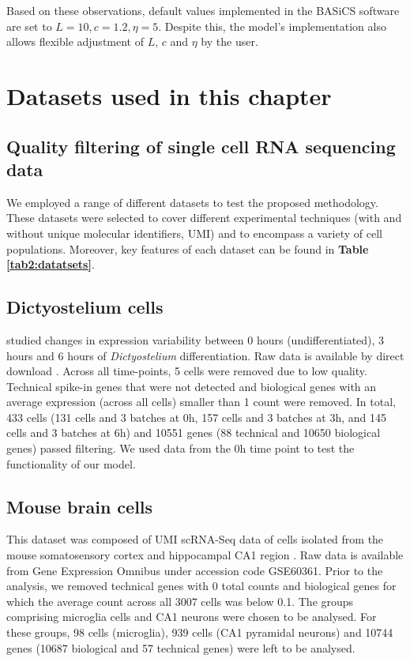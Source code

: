 Based on these observations, default values implemented in the BASiCS software are set to $L=10, c=1.2, \eta=5$. Despite this, the model's implementation also allows flexible adjustment of $L$, $c$ and $\eta$ by the user. 

\section{Datasets used in this chapter} \label{sec2:datasets}

\subsection*{Quality filtering of single cell RNA sequencing data}
We employed a range of different datasets to test the proposed methodology. These datasets were selected to cover different experimental techniques (with and without unique molecular identifiers, UMI) and to encompass a variety of cell populations. Moreover, key features of each dataset can be found in \textbf{Table \ref{tab2:datatsets}}. 

\subsection{Dictyostelium cells} \label{seq::data_dict}

\cite{Antolovic2017} studied changes in expression variability between 0 hours (undifferentiated), 3 hours and 6 hours of \emph{Dictyostelium} differentiation. Raw data is available by direct download \citep[see Data S1 in][]{Antolovic2017}. Across all time-points, 5 cells were removed due to low quality. Technical spike-in genes that were not detected and biological genes with an average expression (across all cells) smaller than 1 count were removed. In total, 433 cells (131 cells and 3 batches at 0h, 157 cells and 3 batches at 3h, and 145 cells and 3 batches at 6h) and 10551 genes (88 technical and 10650 biological genes) passed filtering. We used data from the 0h time point to test the functionality of our model.

\subsection{Mouse brain cells} \label{seq::data_micro}
This dataset was composed of UMI scRNA-Seq data of cells isolated from the mouse somatosensory cortex and hippocampal CA1 region \citep{Zeisel2015}. Raw data is available from Gene Expression Omnibus under accession code GSE60361. 
Prior to the analysis, we removed technical genes with 0 total counts and biological genes for which the average count across all 3007 cells was below 0.1. The groups comprising microglia cells and CA1 neurons were chosen to be analysed. For these groups, 98 cells (microglia), 939 cells (CA1 pyramidal neurons) and 10744 genes (10687 biological and 57 technical genes) were left to be analysed.

